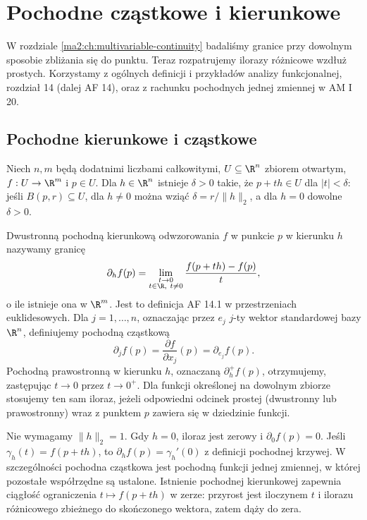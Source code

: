 \chapter{Pochodne cząstkowe i kierunkowe}
\label{ma2:ch:directional-derivatives}

W rozdziale \ref{ma2:ch:multivariable-continuity}
badaliśmy granice przy dowolnym sposobie zbliżania się
do punktu. Teraz rozpatrujemy ilorazy różnicowe wzdłuż
prostych. Korzystamy z ogólnych definicji i przykładów
analizy funkcjonalnej, rozdział 14 (dalej AF 14),
oraz z rachunku pochodnych jednej zmiennej w AM I 20.

\section{Pochodne kierunkowe i cząstkowe}

Niech $n,m$ będą dodatnimi liczbami całkowitymi,
$U\subseteq\R^n$ zbiorem otwartym, $f:U\to\R^m$
i $p\in U$. Dla $h\in\R^n$ istnieje $\delta>0$ takie,
że $p+th\in U$ dla $|t|<\delta$: jeśli
$B(p,r)\subseteq U$, dla $h\ne0$ można wziąć
$\delta=r/\|h\|_2$, a dla $h=0$ dowolne $\delta>0$.

\begin{definicja}
\label{ma2:def:directional}
Dwustronną pochodną kierunkową odwzorowania $f$ w punkcie
$p$ w kierunku $h$ nazywamy granicę
\[
 \partial_h f(p)=\lim_{\substack{t\to0\\t\in\R,\ t\ne0}}
 \frac{f(p+th)-f(p)}{t},
\]
o ile istnieje ona w $\R^m$. Jest to definicja AF 14.1
w przestrzeniach euklidesowych.
Dla $j=1,\ldots,n$, oznaczając przez $e_j$ $j$-ty wektor
standardowej bazy $\R^n$, definiujemy pochodną cząstkową
\[
 \partial_j f(p)=\frac{\partial f}{\partial x_j}(p)
 =\partial_{e_j}f(p).
\]
Pochodną prawostronną w kierunku $h$, oznaczaną
$\partial_h^+f(p)$, otrzymujemy, zastępując $t\to0$
przez $t\to0^+$. Dla funkcji określonej na dowolnym
zbiorze stosujemy ten sam iloraz, jeżeli odpowiedni
odcinek prostej (dwustronny lub prawostronny) wraz
z punktem $p$ zawiera się w dziedzinie funkcji.
\end{definicja}

Nie wymagamy $\|h\|_2=1$. Gdy $h=0$, iloraz jest zerowy
i $\partial_0 f(p)=0$. Jeśli $\gamma_h(t)=f(p+th)$,
to $\partial_h f(p)=\gamma_h'(0)$ z definicji pochodnej
krzywej. W szczególności pochodna cząstkowa jest
pochodną funkcji jednej zmiennej, w której pozostałe
współrzędne są ustalone. Istnienie pochodnej kierunkowej
zapewnia ciągłość ograniczenia $t\mapsto f(p+th)$ w zerze:
przyrost jest iloczynem $t$ i ilorazu różnicowego
zbieżnego do skończonego wektora, zatem dąży do zera.

